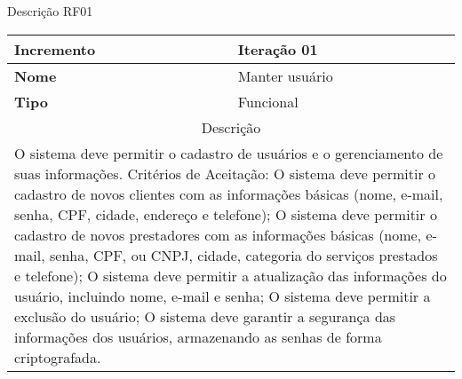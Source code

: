\begin{quadro}[htb]
	\centering
	\caption{\label{Formatação do texto.}Descrição RF01}	
	\begin{tabular}{|l|p{11cm}|}
		\hline
		\textbf{Incremento}    & Iteração 01\\ \hline
		\textbf{Nome}    & Manter usuário\\ \hline
		\textbf{Tipo}    & Funcional\\ \hline
		\multicolumn{2}{|c|}{Descrição}\\ \hline
		\multicolumn{2}{|p{12cm}|}{
			O sistema deve permitir o cadastro de usuários e o gerenciamento de suas informações. \newline
			\newline Critérios de Aceitação: \newline
			O sistema deve permitir o cadastro de novos clientes com as informações básicas (nome, e-mail, senha, CPF, cidade, endereço e telefone); \newline
			\newline O sistema deve permitir o cadastro de novos prestadores com as informações básicas (nome, e-mail, senha, CPF, ou CNPJ, cidade, categoria do serviços prestados e telefone); \newline
			\newline O sistema deve permitir a atualização das informações do usuário, incluindo nome, e-mail e senha; \newline
			\newline O sistema deve permitir a exclusão do usuário; \newline
			O sistema deve garantir a segurança das informações dos usuários, armazenando as senhas de forma criptografada.
			} \\ \hline
	\end{tabular}
\end{quadro}

